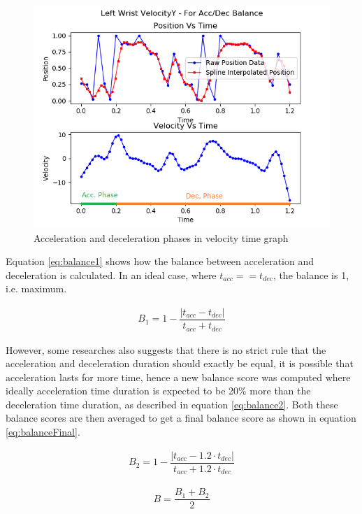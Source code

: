 \begin{figure}
    \centering
    \includegraphics[scale=1]{images/graphs/accDecPhase_Video5_good_LWrist.png}
    \caption{Acceleration and deceleration phases in velocity time graph}
    \label{fig:accDectimes}
\end{figure}

Equation \ref{eq:balance1} shows how the balance between acceleration and deceleration is calculated. In an ideal case, where $t_{acc} == t_{dec}$, the balance is 1, i.e. maximum. 

\begin{gather} 
  B_1 = 1 - \dfrac{|t_{acc} - t_{dec}|}{t_{acc} + t_{dec}}
  \label{eq:balance1}
\end{gather}

However, some researches also suggests that there is no strict rule that the acceleration and deceleration duration should exactly be equal, it is possible that acceleration lasts for more time, hence a new balance score was computed where ideally acceleration time duration is expected to be 20\% more than the deceleration time duration, as described in equation \ref{eq:balance2}. Both these balance scores are then averaged to get a final balance score as shown in equation \ref{eq:balanceFinal}. 

\begin{gather} 
  B_2 = 1 - \dfrac{|t_{acc} - 1.2 \cdot t_{dec}|}{t_{acc} + 1.2 \cdot t_{dec}}
  \label{eq:balance2}
\end{gather}

\begin{gather} 
  B = \dfrac{B_1 + B_2}{2}
  \label{eq:balanceFinal}
\end{gather}

